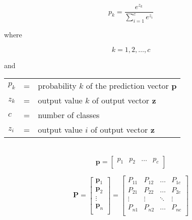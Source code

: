 

\begin{equation}
  p_k = \frac{e^{z_k}}{\sum\limits_{i=1}^{c} e^{z_i}}
  \label{eq:softmax}
\end{equation}

where

\[
  k = 1, 2, \dots, c
\]

and

\begin{tabular}{lll}
  $p_k$ & = & probability $k$ of the prediction vector $\boldsymbol{p}$ \\
  $z_k$ & = & output value $k$ of output vector $\boldsymbol{z}$ \\
  $c$ & = & number of classes \\
  $z_i$ & = & output value $i$ of output vector $\boldsymbol{z}$ \\
\end{tabular}
\\







\begin{equation}
  \boldsymbol{p} =
  \begin{bmatrix}
    p_1 & p_2 & \dots & p_c \\
  \end{bmatrix}
  \label{eq:prediction_vector}
\end{equation}






\begin{equation}
  \boldsymbol{P} =
  \begin{bmatrix}
    \boldsymbol{p}_1 \\
    \boldsymbol{p}_2 \\
    \vdots \\
    \boldsymbol{p}_n \\
  \end{bmatrix} =
  \begin{bmatrix}
    P_{11} & P_{12} & \dots & P_{1c} \\
    P_{21} & P_{22} & \dots & P_{2c} \\
    \vdots & \vdots & \ddots & \vdots \\
    P_{n1} & P_{n2} & \dots & P_{nc} \\
  \end{bmatrix}
  \label{eq:predictions_matrix}
\end{equation}




